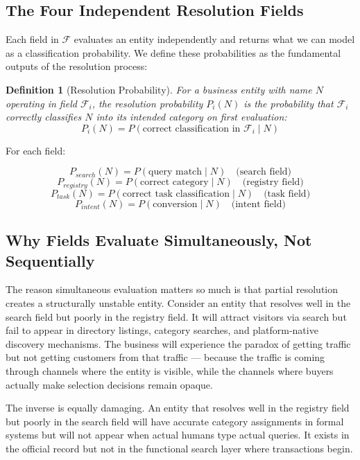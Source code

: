 \documentclass[12pt, openany]{book}
\theoremstyle{thmstyle}
\theoremstyle{defstyle}
\newtheorem{definition}{Definition}[chapter]
\begin{document}
\subsection{The Four Independent Resolution Fields}

Each field in $\mathcal{F}$ evaluates an entity independently and returns what we can model as a classification probability. We define these probabilities as the fundamental outputs of the resolution process:

\begin{definition}[Resolution Probability]
For a business entity with name $N$ operating in field $\mathcal{F}_i$, the resolution probability $P_i(N)$ is the probability that $\mathcal{F}_i$ correctly classifies $N$ into its intended category on first evaluation:
\[
P_i(N) = P(\text{correct classification in } \mathcal{F}_i \mid N)
\]
\end{definition}

For each field:

\[
P_{search}(N) = P(\text{query match} \mid N) \quad \text{(search field)}
\]
\[
P_{registry}(N) = P(\text{correct category} \mid N) \quad \text{(registry field)}
\]
\[
P_{task}(N) = P(\text{correct task classification} \mid N) \quad \text{(task field)}
\]
\[
P_{intent}(N) = P(\text{conversion} \mid N) \quad \text{(intent field)}
\]

\subsection{Why Fields Evaluate Simultaneously, Not Sequentially}

The reason simultaneous evaluation matters so much is that partial resolution creates a structurally unstable entity. Consider an entity that resolves well in the search field but poorly in the registry field. It will attract visitors via search but fail to appear in directory listings, category searches, and platform-native discovery mechanisms. The business will experience the paradox of getting traffic but not getting customers from that traffic --- because the traffic is coming through channels where the entity is visible, while the channels where buyers actually make selection decisions remain opaque.

The inverse is equally damaging. An entity that resolves well in the registry field but poorly in the search field will have accurate category assignments in formal systems but will not appear when actual humans type actual queries. It exists in the official record but not in the functional search layer where transactions begin.
\end{document}
